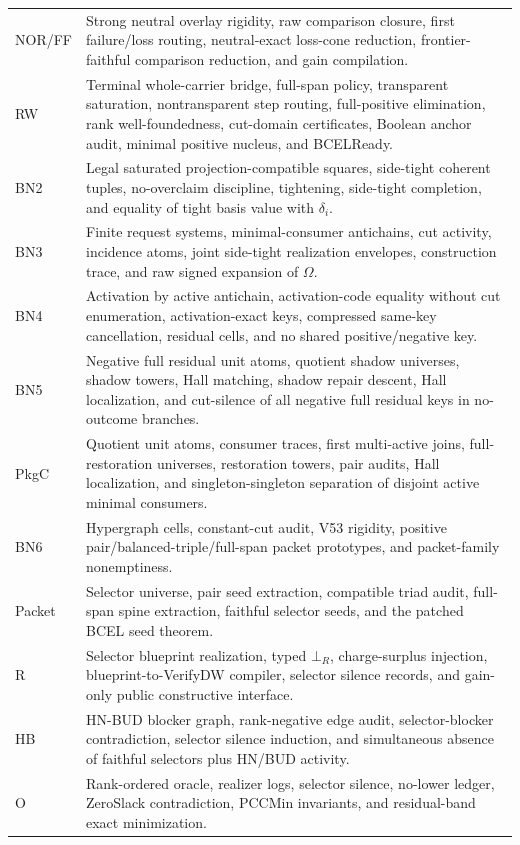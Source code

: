 \documentclass[10.5pt,a4paper]{article}
\newcommand{\Bot}{\bot}
\begin{document}
\begin{longtable}{>{\raggedright\arraybackslash}p{}p{}}
NOR/FF & Strong neutral overlay rigidity, raw comparison closure, first failure/loss routing, neutral-exact loss-cone reduction, frontier-faithful comparison reduction, and gain compilation.\\
RW & Terminal whole-carrier bridge, full-span policy, transparent saturation, nontransparent step routing, full-positive elimination, rank well-foundedness, cut-domain certificates, Boolean anchor audit, minimal positive nucleus, and BCELReady.\\
BN2 & Legal saturated projection-compatible squares, side-tight coherent tuples, no-overclaim discipline, tightening, side-tight completion, and equality of tight basis value with \(\delta_i\).\\
BN3 & Finite request systems, minimal-consumer antichains, cut activity, incidence atoms, joint side-tight realization envelopes, construction trace, and raw signed expansion of \(\Omega\).\\
BN4 & Activation by active antichain, activation-code equality without cut enumeration, activation-exact keys, compressed same-key cancellation, residual cells, and no shared positive/negative key.\\
BN5 & Negative full residual unit atoms, quotient shadow universes, shadow towers, Hall matching, shadow repair descent, Hall localization, and cut-silence of all negative full residual keys in no-outcome branches.\\
PkgC & Quotient unit atoms, consumer traces, first multi-active joins, full-restoration universes, restoration towers, pair audits, Hall localization, and singleton-singleton separation of disjoint active minimal consumers.\\
BN6 & Hypergraph cells, constant-cut audit, V53 rigidity, positive pair/balanced-triple/full-span packet prototypes, and packet-family nonemptiness.\\
Packet & Selector universe, pair seed extraction, compatible triad audit, full-span spine extraction, faithful selector seeds, and the patched BCEL seed theorem.\\
R & Selector blueprint realization, typed \(\Bot_R\), charge-surplus injection, blueprint-to-VerifyDW compiler, selector silence records, and gain-only public constructive interface.\\
HB & HN-BUD blocker graph, rank-negative edge audit, selector-blocker contradiction, selector silence induction, and simultaneous absence of faithful selectors plus HN/BUD activity.\\
O & Rank-ordered oracle, realizer logs, selector silence, no-lower ledger, ZeroSlack contradiction, PCCMin invariants, and residual-band exact minimization.\\

\end{longtable}
\end{document}
